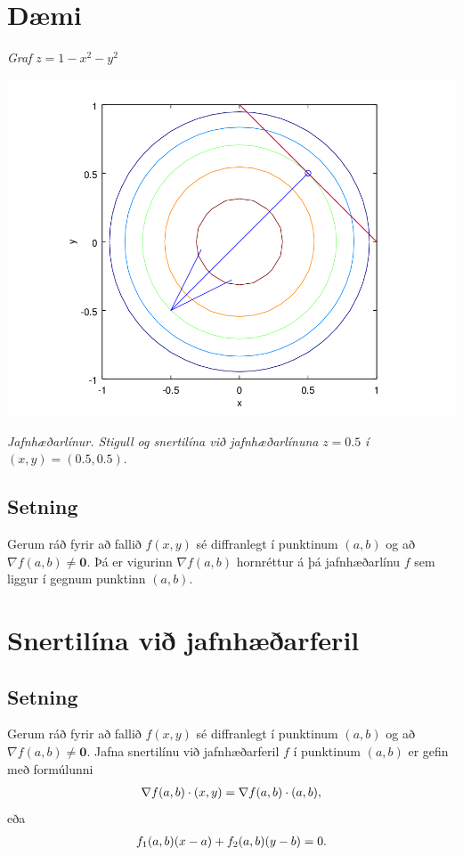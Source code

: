 \documentclass[a4paper,10pt,icelandic]{sphinxmanual}
\begin{document}
\section{Dæmi}
\label{Kafli2:id41}
\emph{Graf} \(z=1-x^2-y^2\)

{\hfill\includegraphics[width=0.600\linewidth]{gradient.png}\hfill}

\emph{Jafnhæðarlínur. Stigull og snertilína við jafnhæðarlínuna} \(z=0.5\) \emph{í} \((x,y) = (0.5,0.5)\).


\subsection{Setning}
\label{Kafli2:id42}
Gerum ráð fyrir að fallið \(f(x,y)\) sé diffranlegt í punktinum
\((a,b)\) og að \(\nabla f(a,b) \neq \mathbf{0}\). Þá er
vigurinn \(\nabla f(a,b)\) hornréttur á þá jafnhæðarlínu \(f\)
sem liggur í gegnum punktinn \((a,b)\).


\section{Snertilína við jafnhæðarferil}
\label{Kafli2:snertilina-vi-jafnhaearferil}\label{Kafli2:index-22}

\subsection{Setning}
\label{Kafli2:id43}
Gerum ráð fyrir að fallið \(f(x,y)\) sé diffranlegt í punktinum
\((a,b)\) og að \(\nabla f(a,b) \neq \mathbf{0}\). Jafna
snertilínu við jafnhæðarferil \(f\) í punktinum \((a,b)\) er
gefin með formúlunni
\begin{gather}
\begin{split}\displaystyle \nabla f(a,b)\cdot (x,y)=\nabla f(a,b)\cdot (a,b),\end{split}\notag
\end{gather}
eða
\begin{gather}
\begin{split}\displaystyle f_1(a,b)(x-a)+f_2(a,b)(y-b)=0.\end{split}\notag
\end{gather}
\end{document}
